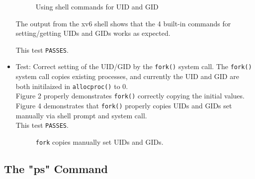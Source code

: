 \documentclass[11pt,letterpaper]{report}
\begin{document}
\begin{itemize}
\begin{figure}[h!]
	\centering
	\caption[uidgid]{Using shell commands for UID and GID}
	\label{fig:uidgidshellcommandtest}
\end{figure}

	The output from the xv6 shell shows that the 4 built-in commands for setting/getting UIDs and GIDs works as expected.
	
	This test {\tt PASSES}.\\
	
	\item Test: Correct setting of the UID/GID by the {\tt fork()} system call.
	The {\tt fork()} system call copies existing processes, and currently the UID and GID are both initilaized in {\tt allocproc()} to 0.\\
	Figure 2 properly demonstrates {\tt fork()} correctly copying the initial values.\\
	Figure 4 demonstrates that {\tt fork()} properly copies UIDs and GIDs set manually via shell prompt and system call.\\
	This test {\tt PASSES}.
	
\begin{figure}[h!]
	\centering
	\caption[uidgid]{{\tt fork} copies manually set UIDs and GIDs.}
	\label{fig:forkcopyuidgidtest}
\end{figure}
		
	\end{itemize}
	
	
	\subsection*{The "ps" Command}
	
\end{document}
